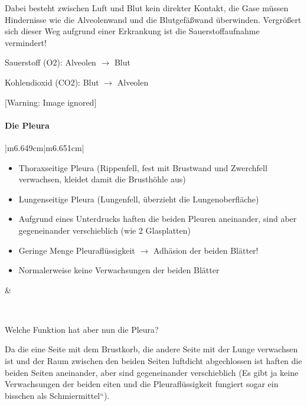 \documentclass{article}
\begin{document}
Dabei besteht zwischen Luft und Blut kein direkter Kontakt, die Gase
m\"ussen Hindernisse wie die Alveolenwand und die Blutgef\"a{\ss}wand
\"uberwinden. Vergr\"o{\ss}ert sich dieser Weg aufgrund einer
Erkrankung ist die Sauerstoffaufnahme vermindert! 

Sauerstoff (O2):   Alveolen ${\rightarrow}$ Blut

Kohlendioxid (CO2):  Blut ${\rightarrow}$ Alveolen

  [Warning: Image ignored] %
 

\paragraph{Die Pleura}
\begin{center}
\tablehead{}\begin{supertabular}{|m{6.649cm}|m{6.651cm}|}
\hline
\begin{itemize}
\item Thoraxseitige Pleura%
%
 (Rippenfell, fest mit  Brustwand und Zwerchfell verwachsen, kleidet
damit die Brusth\"ohle aus)

\item Lungenseitige Pleura (Lungenfell, \"uberzieht die
Lungenoberfl\"ache)

\item Aufgrund eines Unterdrucks haften die beiden Pleuren aneinander,
sind aber gegeneinander verschieblich (wie 2 Glasplatten)

\item Geringe Menge Pleurafl\"ussigkeit ${\rightarrow}$ Adh\"asion der
beiden Bl\"atter!

\item Normalerweise keine Verwachsungen der beiden Bl\"atter

\end{itemize}
 &
 \par

\\\hline
\end{supertabular}
\end{center}
Welche Funktion hat aber nun die Pleura?

Da die eine Seite mit dem Brustkorb, die andere Seite mit der Lunge
verwachsen ist und der Raum zwischen den beiden Seiten luftdicht
abgechlossen ist haften die beiden Seiten aneinander, aber sind
gegeneinander verschieblich (Es gibt ja keine Verwachsungen der beiden
eiten und die Pleurafl\"ussigkeit fungiert sogar ein bisschen als
{\quotedblbase}Schmiermittel{\textquotedblleft}). 
\end{document}
